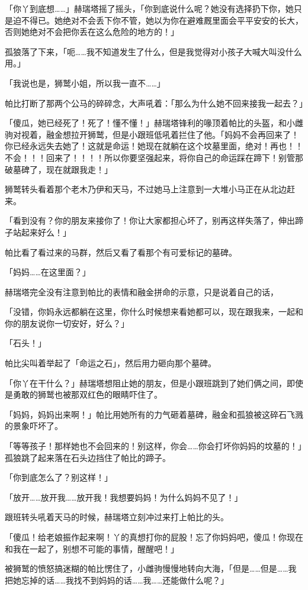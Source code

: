 「你丫到底想……」赫瑞塔摇了摇头，「你到底说什么呢？她没有选择扔下你，她只是迫不得已。她绝对不会丢下你不管，她以为你在避难厩里面会平平安安的长大，否则她绝对不会把你丢在这么危险的地方的！」

孤狼落了下来，「呃……我不知道发生了什么，但是我觉得对小孩子大喊大叫没什么用。」

「我说也是，狮鹫小姐，所以我一直不……」

帕比打断了那两个公马的碎碎念，大声吼着：「那么为什么她不回来接我一起去？」

「傻瓜，她已经死了！死了！懂不懂！」赫瑞塔锋利的喙顶着帕比的头盔，和小雌驹对视着，融金想拉开狮鹫，但是小跟班低吼着拦住了他。「妈妈不会再回来了！你已经永远失去她了！这就是命运！她现在就躺在这个坟墓里面，绝对！再也！！不会！！！回来了！！！！所以你要坚强起来，将你自己的命运踩在蹄下！别管那破墓碑了，现在就跟我走！」

狮鹫转头看着那个老木乃伊和天马，不过她马上注意到一大堆小马正在从北边赶来。

「看到没有？你的朋友来接你了！你让大家都担心坏了，别再这样失落了，伸出蹄子站起来好么！」

帕比看了看过来的马群，然后又看了看那个有可爱标记的墓碑。

「妈妈……在这里面？」

赫瑞塔完全没有注意到帕比的表情和融金拼命的示意，只是说着自己的话，

「没错，你妈永远都躺在这里，你什么时候想来看她都可以，现在跟我来，一起和你的朋友说你一切安好，好么？」

「石头！」

帕比尖叫着举起了「命运之石」，然后用力砸向那个墓碑。

「你丫在干什么？」赫瑞塔想阻止她的朋友，但是小跟班跳到了她们俩之间，即使是勇敢的狮鹫也被那双红色的眼睛吓住了。

「妈妈，妈妈出来啊！」帕比用她所有的力气砸着墓碑，融金和孤狼被这碎石飞溅的景象吓坏了。

「等等孩子！那样她也不会回来的！别这样，你会……你会打坏你妈妈的坟墓的！」孤狼跳了起来落在石头边挡住了帕比的蹄子。

「你到底怎么了？别这样！」

「放开……放开我……放开我！我想要妈妈！为什么妈妈不见了！」

跟班转头吼着天马的时候，赫瑞塔立刻冲过来打上帕比的头。

「傻瓜！给老娘振作起来啊！丫的真想打你的屁股！忘了你妈妈吧，傻瓜！你现在和我在一起了，别想不可能的事情，醒醒吧！」

被狮鹫的愤怒搞迷糊的帕比愣住了，小雌驹慢慢地转向大海，「但是……但是……我把她忘掉的话……我找不到妈妈的话……我……还能做什么呢？」

